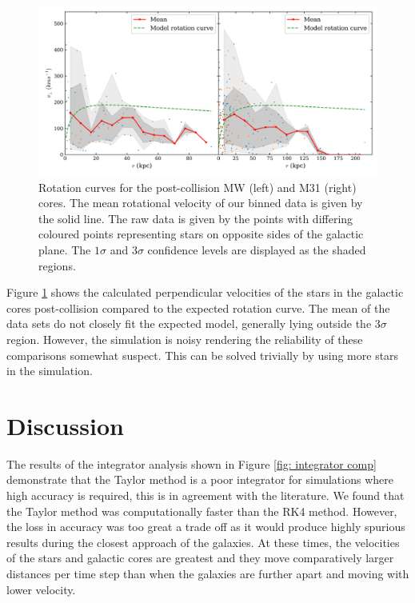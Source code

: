\documentclass[10pt, twocolumn]{revtex4}    %
\begin{document}
\begin{figure}
\centering
\includegraphics[width=\textwidth]{20180316_121926_ROT_CURVE_20_Gyrs}
\caption{Rotation curves for the post-collision MW (left) and M31 (right) cores. The mean rotational velocity of our binned data is given by the solid line. The raw data is given by the points with differing coloured points representing stars on opposite sides of the galactic plane. The $1\sigma$ and $3\sigma$ confidence levels are displayed as the shaded regions.}
\label{fig: ro curve MW}
\end{figure}
Figure \ref{fig: ro curve MW} shows the calculated perpendicular velocities of the stars in the galactic cores post-collision compared to the expected rotation curve. The mean of the data sets do not closely fit the expected model, generally lying outside the $3\sigma$ region. However, the simulation is noisy rendering the reliability of these comparisons somewhat suspect. This can be solved trivially by using more stars in the simulation.

\section{Discussion} 

The results of the integrator analysis shown in Figure \ref{fig: integrator comp} demonstrate that the Taylor method is a poor integrator for simulations where high accuracy is required, this is in agreement with the literature. We found that the Taylor method was computationally faster than the RK4 method. However, the loss in accuracy was too great a trade off as it would produce highly spurious results during the closest approach of the galaxies. At these times, the velocities of the stars and galactic cores are greatest and they move comparatively larger distances per time step than when the galaxies are further apart and moving with lower velocity.
\end{document}
